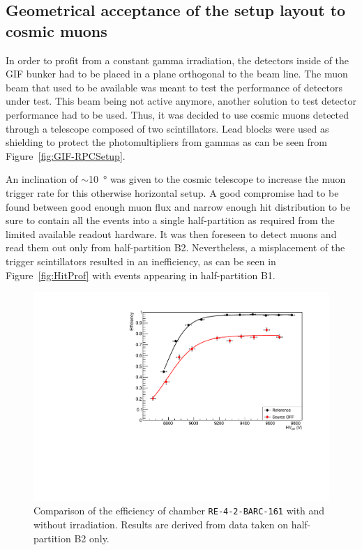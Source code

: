 \endgroup
	
	\subsection{Geometrical acceptance of the setup layout to cosmic muons}
	\label{chapt5:ssec:GeoAcc}
				
	In order to profit from a constant gamma irradiation, the detectors inside of the GIF bunker had to be placed in a plane orthogonal to the beam line. The muon beam that used to be available was meant to test the performance of detectors under test. This beam being not active anymore, another solution to test detector performance had to be used. Thus, it was decided to use cosmic muons detected through a telescope composed of two scintillators. Lead blocks were used as shielding to protect the photomultipliers from gammas as can be seen from Figure~\ref{fig:GIF-RPCSetup}.
				
	An inclination of $\sim$\SI{10}{\degree} was given to the cosmic telescope to increase the muon trigger rate for this otherwise horizontal setup. A good compromise had to be found between good enough muon flux and narrow enough hit distribution to be sure to contain all the events into a single half-partition as required from the limited available readout hardware. It was then foreseen to detect muons and read them out only from half-partition B2. Nevertheless, a misplacement of the trigger scintillators resulted in an inefficiency, as can be seen in Figure~\ref{fig:HitProf} with events appearing in half-partition B1.
	
\begingroup\setlength{\intextsep}{5pt}\setlength{\columnsep}{15pt}
	
	\begin{figure}
            \centering
		\includegraphics[width = \linewidth]{fig/chapt5/Compared-Efficiency.pdf}
		\caption{\label{fig:EffCompar} Comparison of the efficiency of chamber \texttt{RE-4-2-BARC-161} with and without irradiation. Results are derived from data taken on half-partition B2 only.}
	\end{figure}
	
